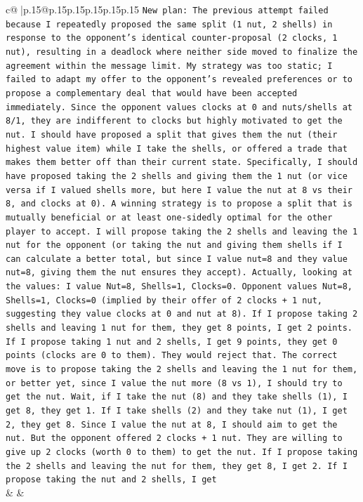 \documentclass{article}
\begin{document}
{\begin{supertabular}{c@{$\;$}|p{.15\linewidth}@{}p{.15\linewidth}p{.15\linewidth}p{.15\linewidth}p{.15\linewidth}p{.15\linewidth}}
{{{\texttt{New plan: The previous attempt failed because I repeatedly proposed the same split (1 nut, 2 shells) in response to the opponent's identical counter{-}proposal (2 clocks, 1 nut), resulting in a deadlock where neither side moved to finalize the agreement within the message limit. My strategy was too static; I failed to adapt my offer to the opponent's revealed preferences or to propose a complementary deal that would have been accepted immediately. Since the opponent values clocks at 0 and nuts/shells at 8/1, they are indifferent to clocks but highly motivated to get the nut. I should have proposed a split that gives them the nut (their highest value item) while I take the shells, or offered a trade that makes them better off than their current state. Specifically, I should have proposed taking the 2 shells and giving them the 1 nut (or vice versa if I valued shells more, but here I value the nut at 8 vs their 8, and clocks at 0). A winning strategy is to propose a split that is mutually beneficial or at least one{-}sidedly optimal for the other player to accept. I will propose taking the 2 shells and leaving the 1 nut for the opponent (or taking the nut and giving them shells if I can calculate a better total, but since I value nut=8 and they value nut=8, giving them the nut ensures they accept). Actually, looking at the values: I value Nut=8, Shells=1, Clocks=0. Opponent values Nut=8, Shells=1, Clocks=0 (implied by their offer of 2 clocks + 1 nut, suggesting they value clocks at 0 and nut at 8). If I propose taking 2 shells and leaving 1 nut for them, they get 8 points, I get 2 points. If I propose taking 1 nut and 2 shells, I get 9 points, they get 0 points (clocks are 0 to them). They would reject that. The correct move is to propose taking the 2 shells and leaving the 1 nut for them, or better yet, since I value the nut more (8 vs 1), I should try to get the nut. Wait, if I take the nut (8) and they take shells (1), I get 8, they get 1. If I take shells (2) and they take nut (1), I get 2, they get 8. Since I value the nut at 8, I should aim to get the nut. But the opponent offered 2 clocks + 1 nut. They are willing to give up 2 clocks (worth 0 to them) to get the nut. If I propose taking the 2 shells and leaving the nut for them, they get 8, I get 2. If I propose taking the nut and 2 shells, I get} \\
            }
        }
    }
    & & \\ \\


\end{supertabular}}
\end{document}
